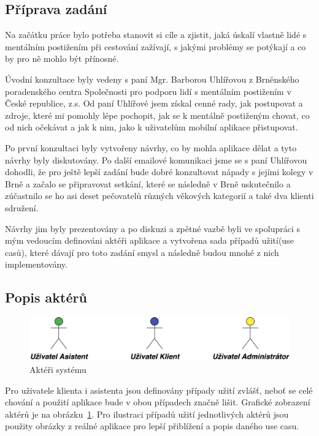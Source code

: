 \documentclass[czech,master,public,dept460,male,java,cpdeclaration]{diploma}
\begin{document}
\subsection{Příprava zadání}
Na začátku práce bylo potřeba stanovit si cíle a zjistit, jaká úskalí vlastně lidé s mentálním
postižením při cestování zažívají, s jakými problémy se potýkají a co by pro ně mohlo být přínosné.

Úvodní konzultace byly vedeny s paní Mgr. Barborou Uhlířovou z Brněnského poradenského centra
Společnosti pro podporu lidí s mentálním postižením v České republice, z.s. Od paní Uhlířové jsem
získal cenné rady, jak postupovat a zdroje, které mi pomohly lépe pochopit, jak se k mentálně postiženým chovat,
 co od nich očekávat a jak k nim, jako k uživatelům mobilní aplikace přistupovat.

Po první konzultaci byly vytvořeny návrhy, co by mohla aplikace dělat a tyto návrhy byly diskutovány.
Po další emailové komunikaci jsme se s paní Uhlířovou dohodli, že pro ještě lepší zadání bude
dobré konzultovat nápady s jejími kolegy v Brně a začalo se připravovat setkání, které se následně
v Brně uskutečnilo a zúčastnilo se ho asi deset pečovatelů různých věkových kategorií a také dva klienti
sdružení.

Návrhy jim byly prezentovány a po diskuzi a zpětné vazbě byli ve spolupráci s mým vedoucím definováni
aktéři aplikace a vytvořena sada případů užití(use casů), které dávají pro toto zadání smysl a následně
budou mnohé z nich implementovány.

\subsection{Popis aktérů}
\begin{figure}[H]
        \centering
                \includegraphics[scale=0.14]{img/actors.png}
        \caption{Aktéři systému}
        \label{fig:actors}
\end{figure}

Pro uživatele klienta i asistenta jsou definovány případy užití zvlášť, neboť se celé chování
a použití aplikace bude v obou případech značně lišit. Grafické zobrazení aktérů je na obrázku~\ref{fig:actors}.
Pro ilustraci případů užití jednotlivých aktérů jsou použity obrázky z reálné aplikace pro
lepší přiblížení a popis daného use casu.
\end{document}
